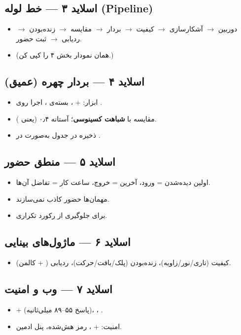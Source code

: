 \documentclass[12pt,a4paper]{article}
\begin{document}
\subsection*{اسلاید ۳ — خط لوله (Pipeline)}
\begin{itemize}[rightmargin=0pt]
  \item دوربین $\rightarrow$ آشکارسازی $\rightarrow$ کیفیت $\rightarrow$ بردار $\rightarrow$ مقایسه $\rightarrow$ زنده‌بودن $\rightarrow$ ردیابی $\rightarrow$ ثبت حضور.
  \item (همان نمودار بخش ۴ را کپی کن.)
\end{itemize}

\subsection*{اسلاید ۴ — بردار چهره (عمیق)}
\begin{itemize}[rightmargin=0pt]
  \item ابزار:  + ، بسته‌ی ، اجرا روی .
  \item مقایسه با \textbf{شباهت کسینوسی}؛ آستانه ۰٫۴ (یعنی ).
  \item ذخیره در جدول  به‌صورت  در .
\end{itemize}

\subsection*{اسلاید ۵ — منطق حضور}
\begin{itemize}[rightmargin=0pt]
  \item اولین دیده‌شدن = ورود، آخرین = خروج، ساعت کار = تفاضل آن‌ها.
  \item مهمان‌ها حضور کاذب نمی‌سازند.
  \item {} برای جلوگیری از رکورد تکراری.
\end{itemize}

\subsection*{اسلاید ۶ — ماژول‌های بینایی}
\begin{itemize}[rightmargin=0pt]
  \item کیفیت (تاری/نور/زاویه)، زنده‌بودن (پلک/بافت/حرکت)، ردیابی ( + کالمن).
\end{itemize}

\subsection*{اسلاید ۷ — وب و امنیت}
\begin{itemize}[rightmargin=0pt]
  \item {} +  (پاسخ ۵۵–۸۹ میلی‌ثانیه)، ، .
  \item امنیت:  + ، رمز هش‌شده، پنل ادمین.
\end{itemize}
\end{document}

